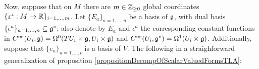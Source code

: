 


Now, suppose that on $M$ there are $m \in \mathbb{Z}_{\geq 0}$ global coordinates $\{x^i: M \to \mathbb{R}\}_{i = 1, \dots, m}$. Let $\{E_a\}_{a = 1, \dots, n}$ be a basis of $\mathfrak{g}$, with dual basis $\{\epsilon^a\}_{a = 1, \dots, n} \subset \alg g^*$; also denote by $E_a$ and $\epsilon^a$ the corresponding constant functions in $C^\infty(U_i, \mathfrak{g}) = \Omega^0(TU_i \times \mathfrak{g}, U_i \times \mathfrak{g})$ and $C^\infty(U_i, \mathfrak{g}^*) = \Omega^1(U_i \times \mathfrak{g})$. Additionally, suppose that $\{e_u\}_{u = 1, \dots, t}$ is a basis of $V$. The following in a straighforward generalization of proposition \ref{propositionDecompOfScalarValuedFormsTLA}:

